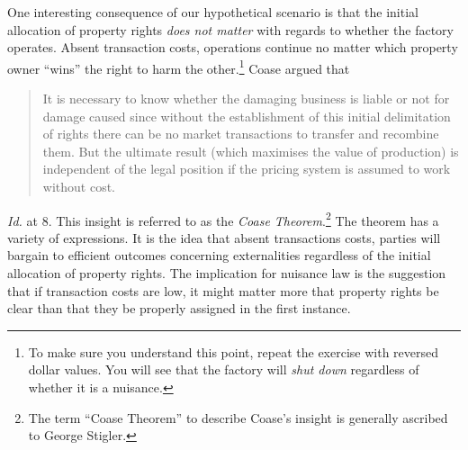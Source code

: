 One interesting consequence of our hypothetical scenario is that the initial
allocation of property rights \textit{does not matter} with regards to whether
the factory operates. Absent transaction costs, operations continue no matter
which property owner ``wins'' the right to harm the other.\footnote{To make sure
you understand this point, repeat the exercise with reversed dollar values. You
will see that the factory will \textit{shut down} regardless of whether it is a
nuisance.} Coase argued that 
\begin{quote}
It is necessary to know whether the damaging business is liable or not for
damage caused since without the establishment of this initial delimitation of
rights there can be no market transactions to transfer and recombine them. But
the ultimate result (which maximises the value of production) is independent of
the legal position if the pricing system is assumed to work without cost.
\end{quote}
\textit{Id.} at 8. This insight is referred to as the \textit{Coase
Theorem}.\footnote{The term ``Coase Theorem'' to describe Coase's insight is
generally ascribed to George Stigler.} The theorem has a variety of expressions.
It is the idea that absent transactions costs, parties will bargain to efficient
outcomes concerning externalities regardless of the initial allocation of
property rights. The implication for nuisance law is the suggestion that if
transaction costs are low, it might matter more that property rights be clear
than that they be properly assigned in the first instance.

